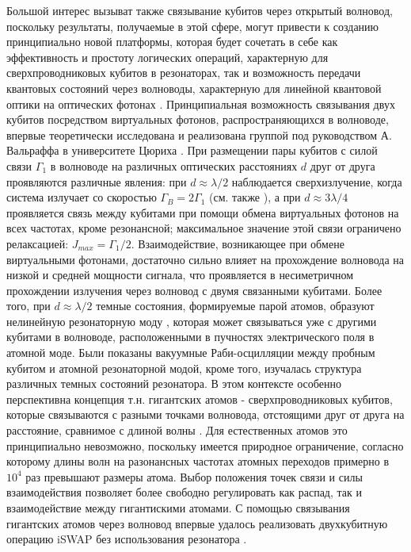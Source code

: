 Большой интерес вызыват также связывание кубитов через открытый волновод, поскольку результаты, получаемые в этой сфере, могут привести к созданию принципиально новой платформы, которая будет сочетать в себе как эффективность и простоту логических операций, характерную для сверхпроводниковых кубитов в резонаторах, так и возможность передачи квантовых состояний через волноводы, характерную для линейной квантовой оптики на оптических фотонах \cite{LOQCreview}. Принципиальная возможность связывания двух кубитов посредством виртуальных фотонов, распространяющихся в волноводе, впервые теоретически исследована и реализована группой под руководством А. Вальраффа в университете Цюриха \cite{vanLoo1494}. При размещении пары кубитов с силой связи $\Gamma_1$ в волноводе на различных оптических расстояниях $d$ друг от друга проявляются различные явления: при $d \approx \lambda/2$ наблюдается сверхизлучение, когда система излучает со скоростью $\Gamma_B = 2\Gamma_1$ (см. также \cite{mlynek2014observation}), а при $d\approx 3\lambda/4$ проявляется связь между кубитами при помощи обмена виртуальных фотонов на всех частотах, кроме резонансной; максимальное значение этой связи ограничено релаксацией: $J_{max}=\Gamma_1/2$. Взаимодействие, возникающее при обмене виртуальными фотонами, достаточно сильно влияет на прохождение волновода на низкой и средней мощности сигнала, что проявляется в несиметричном прохождении излучения через волновод с двумя связанными кубитами. Более того, при $d \approx \lambda/2$ темные состояния, формируемые парой атомов, образуют нелинейную резонаторную моду \cite{mirhosseini2019cavity}, которая может связываться уже с другими кубитами в волноводе, расположенными в пучностях электрического поля в атомной моде.  Были показаны вакуумные Раби-осцилляции между пробным кубитом и атомной резонаторной модой, кроме того, изучалась структура различных темных состояний резонатора. В этом контексте особенно перспективна концепция т.н. гигантских атомов - сверхпроводниковых кубитов, которые связываются с разными точками волновода, отстоящими друг от друга на расстояние, сравнимое с длиной волны \cite{kockum2019quantum}. Для естественных атомов это принципиально невозможно, поскольку имеется природное ограничение, согласно которому длины волн на разонансных частотах атомных переходов примерно в $10^4$ раз превышают размеры атома. Выбор положения точек связи и силы взаимодействия позволяет более свободно регулировать как распад, так и взаимодействие между гигантискими атомами. С помощью связывания гигантских атомов через волновод впервые удалось реализовать двухкубитную операцию iSWAP без использования резонатора \cite[]{kannan2019waveguide} . 

